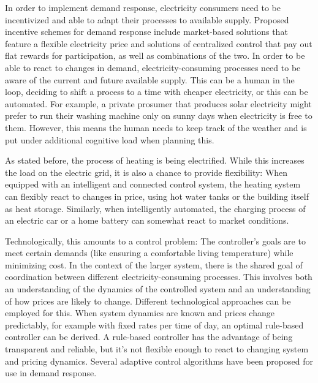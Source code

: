 In order to implement demand response, electricity consumers need to be incentivized and able to adapt their processes to available supply.
Proposed incentive schemes for demand response include market-based solutions that feature a flexible electricity price and solutions of centralized control that pay out flat rewards for participation, as well as combinations of the two. 
In order to be able to react to changes in demand, electricity-consuming processes need to be aware of the current and future available supply.
This can be a human in the loop, deciding to shift a process to a time with cheaper electricity, or this can be automated.
For example, a private prosumer that produces solar electricity might prefer to run their washing machine only on sunny days when electricity is free to them.
However, this means the human needs to keep track of the weather and is put under additional cognitive load when planning this.

As stated before, the process of heating is being electrified.
While this increases the load on the electric grid, it is also a chance to provide flexibility:
When equipped with an intelligent and connected control system, the heating system can flexibly react to changes in price, using hot water tanks or the building itself as heat storage.
Similarly, when intelligently automated, the charging process of an electric car or a home battery can somewhat react to market conditions.

Technologically, this amounts to a control problem:
The controller's goals are to meet certain demands (like ensuring a comfortable living temperature) while minimizing cost. In the context of the larger system, there is the shared goal of coordination between different electricity-consuming processes.
This involves both an understanding of the dynamics of the controlled system and an understanding of how prices are likely to change.
Different technological approaches can be employed for this.
When system dynamics are known and prices change predictably, for example with fixed rates per time of day, an optimal rule-based controller can be derived. 
A rule-based controller has the advantage of being transparent and reliable, but it's not flexible enough to react to changing system and pricing dynamics.
Several adaptive control algorithms have been proposed for use in demand response. 


